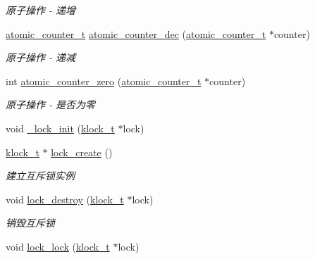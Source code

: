 \begin{DoxyCompactItemize}
\begin{DoxyCompactList}\small\item\em 原子操作 -\/ 递增 \end{DoxyCompactList}\item 
\hyperlink{a00066_a0d043bbb6b8db19fea54ab9271d352b6_a0d043bbb6b8db19fea54ab9271d352b6}{atomic\+\_\+counter\+\_\+t} \hyperlink{a00138_gafc2df03d75cf9168b72e8c5e11953437_gafc2df03d75cf9168b72e8c5e11953437}{atomic\+\_\+counter\+\_\+dec} (\hyperlink{a00066_a0d043bbb6b8db19fea54ab9271d352b6_a0d043bbb6b8db19fea54ab9271d352b6}{atomic\+\_\+counter\+\_\+t} $\ast$counter)
\begin{DoxyCompactList}\small\item\em 原子操作 -\/ 递减 \end{DoxyCompactList}\item 
int \hyperlink{a00138_ga141897cac9743394a99ff7780daa6a80_ga141897cac9743394a99ff7780daa6a80}{atomic\+\_\+counter\+\_\+zero} (\hyperlink{a00066_a0d043bbb6b8db19fea54ab9271d352b6_a0d043bbb6b8db19fea54ab9271d352b6}{atomic\+\_\+counter\+\_\+t} $\ast$counter)
\begin{DoxyCompactList}\small\item\em 原子操作 -\/ 是否为零 \end{DoxyCompactList}\item 
void \hyperlink{a00099_a9aec45e2aae3dcc89d489947bcec36a5_a9aec45e2aae3dcc89d489947bcec36a5}{\+\_\+lock\+\_\+init} (\hyperlink{a00066_a4c2f62ab63ab1fd49c71e52bbda0f393_a4c2f62ab63ab1fd49c71e52bbda0f393}{klock\+\_\+t} $\ast$lock)
\item 
\hyperlink{a00066_a4c2f62ab63ab1fd49c71e52bbda0f393_a4c2f62ab63ab1fd49c71e52bbda0f393}{klock\+\_\+t} $\ast$ \hyperlink{a00099_a7860cb0060346d30b45ea9cb824c2be0_a7860cb0060346d30b45ea9cb824c2be0}{lock\+\_\+create} ()
\begin{DoxyCompactList}\small\item\em 建立互斥锁实例 \end{DoxyCompactList}\item 
void \hyperlink{a00099_aee8678800992b6012933740a9d7528af_aee8678800992b6012933740a9d7528af}{lock\+\_\+destroy} (\hyperlink{a00066_a4c2f62ab63ab1fd49c71e52bbda0f393_a4c2f62ab63ab1fd49c71e52bbda0f393}{klock\+\_\+t} $\ast$lock)
\begin{DoxyCompactList}\small\item\em 销毁互斥锁 \end{DoxyCompactList}\item 
void \hyperlink{a00099_a86243edfa22b75eec0d653c36ba238bf_a86243edfa22b75eec0d653c36ba238bf}{lock\+\_\+lock} (\hyperlink{a00066_a4c2f62ab63ab1fd49c71e52bbda0f393_a4c2f62ab63ab1fd49c71e52bbda0f393}{klock\+\_\+t} $\ast$lock)

\end{DoxyCompactItemize}
